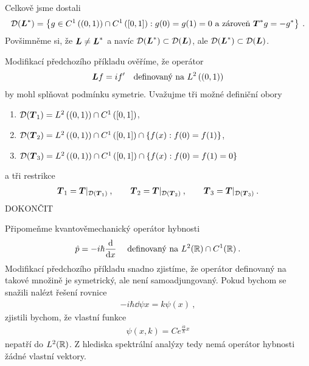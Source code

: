 \begin{example}
Celkově jsme dostali \begin{align*}
    \mathcal{D}(\boldsymbol{L}^*) = \left \lbrace g \in C^1 \left( (0,1)\right) \cap C^1 \left(  [0,1] \right) :  g(0)=g(1)=0 \text{ a zároveň } \boldsymbol{T}^* g=-g^* \right \rbrace \:.
\end{align*}
Povšimněme si, že $\boldsymbol{L} \neq \boldsymbol{L}^* $ a navíc $\mathcal{D}(\boldsymbol{L}^*) \subset \mathcal{D}(\boldsymbol{L})$, ale $\mathcal{D}(\boldsymbol{L}^*) \subset \mathcal{D}(\boldsymbol{L})$.
\end{example}

\begin{example}
Modifikací předchozího příkladu ověříme, že operátor \begin{align*}
    \boldsymbol{L} f = i f' \quad \text{definovaný na } L^2 \left( (0,1) \right)
\end{align*}
by mohl splňovat podmínku symetrie.
Uvažujme tři možné definiční obory \begin{enumerate}
    \item $\mathcal{D}(\boldsymbol{T}_1) = L^2 \left( (0,1) \right) \cap  C^1 \left( [0,1] \right)$,
    \item $\mathcal{D}(\boldsymbol{T}_2) = L^2 \left( (0,1) \right) \cap  C^1 \left( [0,1] \right) \cap \{ f(x): f(0)=f(1)\}$,
    \item $\mathcal{D}(\boldsymbol{T}_3) = L^2 \left( (0,1) \right) \cap  C^1 \left( [0,1] \right) \cap \{ f(x): f(0)=f(1)=0\}$
\end{enumerate}
a tři restrikce \begin{align*}
    \boldsymbol{T}_1 = \boldsymbol{T}\rvert_{\mathcal{D}(\boldsymbol{T}_1)} \:, \qquad \boldsymbol{T}_2 = \boldsymbol{T}\rvert_{\mathcal{D}(\boldsymbol{T}_2)} \:, \qquad \boldsymbol{T}_3 = \boldsymbol{T}\rvert_{\mathcal{D}(\boldsymbol{T}_3)} \:.
\end{align*}
DOKONČIT
\end{example}

\begin{remark}
Připomeňme kvantověmechanický operátor hybnosti \begin{align*}
    \hat p = -i \hbar \frac{\mathrm{d} }{\mathrm{d} x} \; \quad \text{definovaný na } L^2(\mathbb{R}) \cap C^1(\mathbb{R}) \:.
\end{align*}
Modifikací předchozího příkladu snadno zjistíme, že operátor definovaný na takové množině je symetrický, ale není samoadjungovaný. Pokud bychom se snažili nalézt řešení rovnice \begin{align*}
    -i \hbar \dd{\psi}{x} = k \psi(x) \:,
\end{align*}
zjistili bychom, že vlastní funkce \begin{align*}
    \psi(x, k) = C e^{\frac{ik}{\hbar} x}
\end{align*}
nepatří do $L^2(\mathbb{R})$. Z hlediska spektrální analýzy tedy nemá operátor hybnosti žádné vlastní vektory.
\end{remark}
